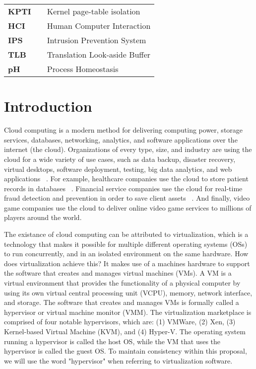 \documentclass{report}
\begin{document}
\begin{spacing}{1.5}
\begin{longtable}{lcl}
\large{\bf KPTI}  & & \large{Kernel page-table isolation} \\
\large{\bf HCI}  & & \large{Human Computer Interaction} \\
\large{\bf IPS}  & & \large{Intrusion Prevention System} \\
\large{\bf TLB}  & & \large{Translation Look-aside Buffer} \\
\large{\bf pH}  & & \large{Process Homeostasis} \\
\end{longtable}
















\newpage
\chapter{Introduction}

{\large
Cloud computing is a modern method for delivering computing power, storage services, databases, networking, analytics, and software applications over the internet (the cloud). Organizations of every type, size, and industry are using the cloud for a wide variety of use cases, such as data backup, disaster recovery, virtual desktops, software deployment, testing, big data analytics, and web applications ~\cite{BELLO2021103441}. For example, healthcare companies use the cloud to store patient records in databases ~\cite{BELLO2021103441}. Financial service companies use the cloud for real-time fraud detection and prevention in order to save client assets ~\cite{BELLO2021103441}. And finally, video game companies use the cloud to deliver online video game services to millions of players around the world.
\newline
}

{\large
\noindent The existance of cloud computing can be attributed to virtualization, which is a technology that makes it possible for multiple different operating systems (OSs) to run concurrently, and in an isolated environment on the same hardware. How does virtualization achieve this? It makes use of a machines hardware to support the software that creates and manages virtual machines (VMs). A VM is a virtual environment that provides the functionality of a physical computer by using its own virtual central processing unit (VCPU), memory, network interface, and storage. The software that creates and manages VMs is formally called a hypervisor or virtual machine monitor (VMM). The virtualization marketplace is comprised of four notable hypervisors, which are: (1) VMWare, (2) Xen, (3) Kernel-based Virtual Machine (KVM), and (4) Hyper-V. The operating system running a hypervisor is called the host OS, while the VM that uses the hypervisor is called the guest OS. To maintain consistency within this proposal, we will use the word "hypervisor" when referring to virtualization software.
\newline
}


\end{spacing}
\end{document}
